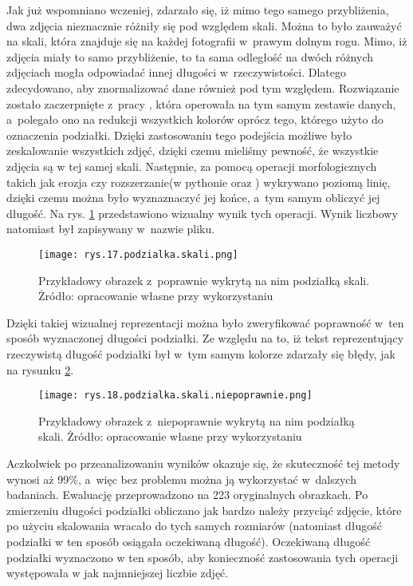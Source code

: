 Jak już wspomniano wczeniej, zdarzało się, iż mimo tego samego przybliżenia, dwa zdjęcia nieznacznie różniły się pod względem skali. Można to było zauważyć na skali, która znajduje się na każdej fotografii w~prawym dolnym rogu. Mimo, iż zdjęcia miały to samo przybliżenie, to ta sama odległość na dwóch różnych zdjęciach mogła odpowiadać innej długości w~rzeczywistości. Dlatego zdecydowano, aby znormalizować dane również pod tym względem. Rozwiązanie zostało zaczerpnięte z~pracy \cite{Reczek21}, która operowała na tym samym zestawie danych, a~polegało ono na redukcji wszystkich kolorów oprócz tego, którego użyto do oznaczenia podziałki. Dzięki zastosowaniu tego podejścia możliwe było zeskalowanie wszystkich zdjęć, dzięki czemu mieliśmy pewność, że wszystkie zdjęcia są w tej samej skali. Następnie, za pomocą operacji morfologicznych takich jak erozja czy rozszerzanie(w pythonie  oraz ) wykrywano poziomą linię, dzięki czemu można było wyznaznaczyć jej końce, a~tym samym obliczyć jej długość. Na rys. \ref{fig:mesh17} przedstawiono wizualny wynik tych operacji. Wynik liczbowy natomiast był zapisywany w~nazwie pliku. 
\begin{figure}[h]
    \centering
    \texttt{[image: rys.17.podzialka.skali.png]}
    \caption{Przykładowy obrazek z~poprawnie wykrytą na nim podziałką skali. Żródło: opracowanie własne przy wykorzystaniu \cite{Reczek21, Pirowski17}}
    \label{fig:mesh17}
\end{figure}
Dzięki takiej wizualnej reprezentacji można było zweryfikować poprawność w~ten sposób wyznaczonej długości podziałki. Ze względu na to, iż tekst reprezentujący rzeczywistą długość podziałki był w~tym samym kolorze zdarzały się błędy, jak na rysunku \ref{fig:mesh18}. 
\begin{figure}[h]
    \centering
    \texttt{[image: rys.18.podzialka.skali.niepoprawnie.png]}
    \caption{Przykładowy obrazek z~niepoprawnie wykrytą na nim podziałką skali. Żródło: opracowanie własne przy wykorzystaniu \cite{Reczek21, Pirowski17}}
    \label{fig:mesh18}
\end{figure}
Aczkolwiek po przeanalizowaniu wyników okazuje się, że skuteczność tej metody wynosi aż 99\%, a~więc bez problemu można ją wykorzystać w~dalszych badaniach. Ewaluację przeprowadzono na 223 oryginalnych obrazkach. Po zmierzeniu długości podziałki obliczano jak bardzo należy przyciąć zdjęcie, które po użyciu skalowania wracało do tych samych rozmiarów (natomiast długość podziałki w ten sposób osiągała oczekiwaną długość). Oczekiwaną długość podziałki wyznaczono w ten sposób, aby konieczność zastosowania tych operacji występowała w jak najmniejszej liczbie zdjęć. 

